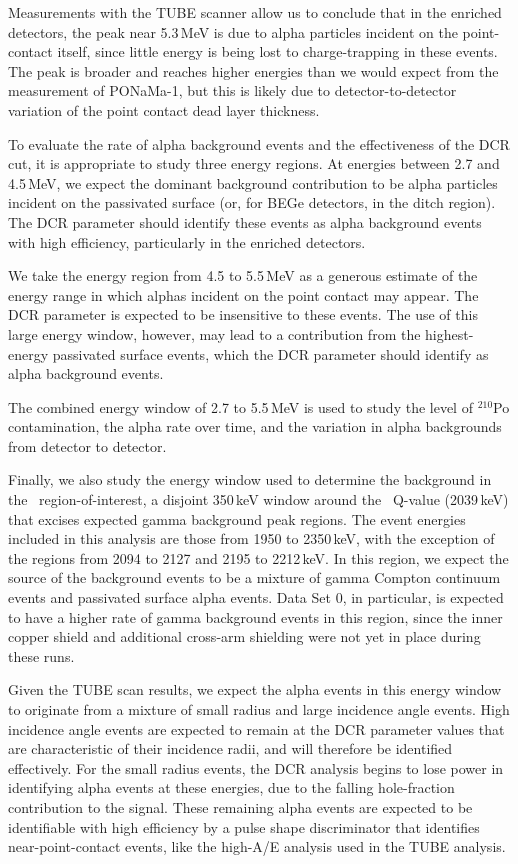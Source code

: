 Measurements with the TUBE scanner allow us to conclude that in the enriched detectors, the peak near 5.3\,MeV is due to alpha particles incident on the point-contact itself, since little energy is being lost to charge-trapping in these events. The peak is broader and reaches higher energies than we would expect from the measurement of PONaMa-1, but this is likely due to detector-to-detector variation of the point contact dead layer thickness. 

To evaluate the rate of alpha background events and the effectiveness of the DCR cut, it is appropriate to study three energy regions. At energies between 2.7 and 4.5\,MeV, we expect the dominant background contribution to be alpha particles incident on the passivated surface (or, for BEGe detectors, in the ditch region). The DCR parameter should identify these events as alpha background events with high efficiency, particularly in the enriched detectors. 

We take the energy region from 4.5 to 5.5\,MeV as a generous estimate of the energy range in which alphas incident on the point contact may appear. The DCR parameter is expected to be insensitive to these events.  The use of this large energy window, however, may lead to a contribution from the highest-energy passivated surface events, which the DCR parameter should identify as alpha background events. 

The combined energy window of 2.7 to 5.5\,MeV is used to study the level of $^{210}$Po contamination, the alpha rate over time, and the variation in alpha backgrounds from detector to detector. 

Finally, we also study the energy window used to determine the background in the \nonubb\ region-of-interest, a disjoint 350\,keV window around the \nonubb\ Q-value (2039\,keV) that excises expected gamma background peak regions. The event energies included in this analysis are those from 1950 to 2350\,keV, with the exception of the regions from 2094 to 2127 and 2195 to 2212\,keV. In this region, we expect the source of the background events to be a mixture of gamma Compton continuum events and passivated surface alpha events. Data Set 0, in particular, is expected to have a higher rate of gamma background events in this region, since the inner copper shield and additional cross-arm shielding were not yet in place during these runs.

Given the TUBE scan results, we expect the alpha events in this energy window to originate from a mixture of small radius and large incidence angle events. High incidence angle events are expected to remain at the DCR parameter values that are characteristic of their incidence radii, and will therefore be identified effectively. For the small radius events, the DCR analysis begins to lose power in identifying alpha events at these energies, due to the falling hole-fraction contribution to the signal. These remaining alpha events are expected to be identifiable with high efficiency by a pulse shape discriminator that identifies near-point-contact events, like the high-A/E analysis used in the TUBE analysis. 

